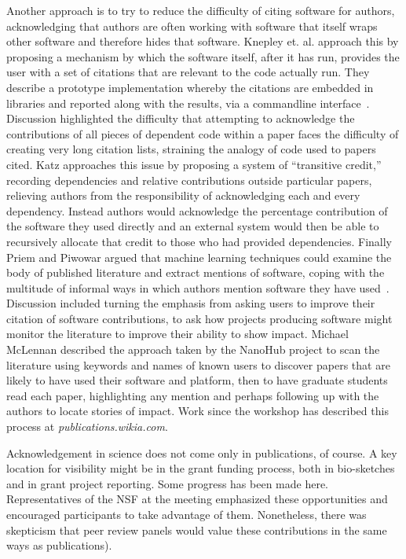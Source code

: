 \documentclass[11pt, oneside]{amsart}
\begin{document}
Another approach is to try to reduce the difficulty of citing software for authors, acknowledging that authors are often working with software that itself wraps other software and therefore hides that software. Knepley et. al. approach this by proposing a mechanism by which the software itself, after it has run, provides the user with a set of citations that are relevant to the code actually run. They describe a prototype implementation whereby the citations are embedded in libraries and reported along with the results, via a commandline interface~\cite{Knepley_WSSSPE}. Discussion highlighted the difficulty that attempting to acknowledge the contributions of all pieces of dependent code within a paper faces the difficulty of creating very long citation lists, straining the analogy of code used to papers cited. Katz approaches this issue by proposing a system of ``transitive credit,'' recording dependencies and relative contributions outside particular papers, relieving authors from the responsibility of acknowledging each and every dependency. Instead authors would acknowledge the percentage contribution of the software they used directly and an external system would then be able to recursively allocate that credit to those who had provided dependencies. Finally Priem and Piwowar argued that machine learning techniques could examine the body of published literature and extract mentions of software, coping with the multitude of informal ways in which authors mention software they have used~\cite{Priem_WSSSPE}.  Discussion included turning the emphasis from asking users to improve their citation of software contributions, to ask how projects producing software might monitor the literature to improve their ability to show impact. Michael McLennan described the approach taken by the NanoHub project to scan the literature using keywords and names of known users to discover papers that are likely to have used their software and platform, then to have graduate students read each paper, highlighting any mention and perhaps following up with the authors to locate stories of impact.  Work since the workshop has described this process at \textit{publications.wikia.com}.

Acknowledgement in science does not come only in publications, of course. A key location for visibility might be in the grant funding process, both in bio-sketches and in grant project reporting. Some progress has been made here. Representatives of the NSF at the meeting emphasized these opportunities and encouraged participants to take advantage of them. Nonetheless, there was skepticism that peer review panels would value these contributions in the same ways as publications).
\end{document}

